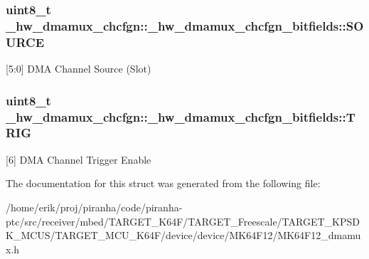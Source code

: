 \subsubsection[{\texorpdfstring{S\+O\+U\+R\+CE}{SOURCE}}]{\setlength{\rightskip}{0pt plus 5cm}uint8\+\_\+t \+\_\+hw\+\_\+dmamux\+\_\+chcfgn\+::\+\_\+hw\+\_\+dmamux\+\_\+chcfgn\+\_\+bitfields\+::\+S\+O\+U\+R\+CE}\hypertarget{struct__hw__dmamux__chcfgn_1_1__hw__dmamux__chcfgn__bitfields_a94410b3b8e61c9d344b0ac16a1581bdd}{}\label{struct__hw__dmamux__chcfgn_1_1__hw__dmamux__chcfgn__bitfields_a94410b3b8e61c9d344b0ac16a1581bdd}
\mbox{[}5\+:0\mbox{]} D\+MA Channel Source (Slot) 
\subsubsection[{\texorpdfstring{T\+R\+IG}{TRIG}}]{\setlength{\rightskip}{0pt plus 5cm}uint8\+\_\+t \+\_\+hw\+\_\+dmamux\+\_\+chcfgn\+::\+\_\+hw\+\_\+dmamux\+\_\+chcfgn\+\_\+bitfields\+::\+T\+R\+IG}\hypertarget{struct__hw__dmamux__chcfgn_1_1__hw__dmamux__chcfgn__bitfields_a996a467955917bbdc0eaa4a4f4d4c189}{}\label{struct__hw__dmamux__chcfgn_1_1__hw__dmamux__chcfgn__bitfields_a996a467955917bbdc0eaa4a4f4d4c189}
\mbox{[}6\mbox{]} D\+MA Channel Trigger Enable 

The documentation for this struct was generated from the following file\+:\begin{DoxyCompactItemize}
\item 
/home/erik/proj/piranha/code/piranha-\/ptc/src/receiver/mbed/\+T\+A\+R\+G\+E\+T\+\_\+\+K64\+F/\+T\+A\+R\+G\+E\+T\+\_\+\+Freescale/\+T\+A\+R\+G\+E\+T\+\_\+\+K\+P\+S\+D\+K\+\_\+\+M\+C\+U\+S/\+T\+A\+R\+G\+E\+T\+\_\+\+M\+C\+U\+\_\+\+K64\+F/device/device/\+M\+K64\+F12/M\+K64\+F12\+\_\+dmamux.\+h\end{DoxyCompactItemize}
